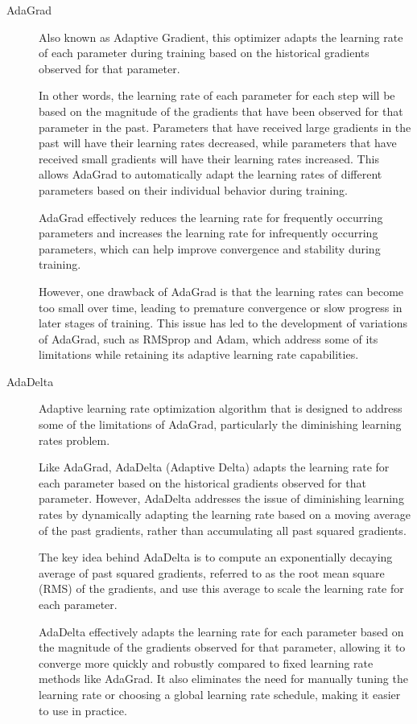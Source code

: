 \documentclass[a4paper]{article}
\begin{document}
\begin{description}
\item[AdaGrad]
Also known as Adaptive Gradient, this optimizer adapts the learning rate of each parameter during training based on the historical gradients observed for that parameter.

In other words, the learning rate of each parameter for each step will be based on the magnitude of the gradients that have been observed for that parameter in the past. Parameters that have received large gradients in the past will have their learning rates decreased, while parameters that have received small gradients will have their learning rates increased. This allows AdaGrad to automatically adapt the learning rates of different parameters based on their individual behavior during training.

AdaGrad effectively reduces the learning rate for frequently occurring parameters and increases the learning rate for infrequently occurring parameters, which can help improve convergence and stability during training. 

However, one drawback of AdaGrad is that the learning rates can become too small over time, leading to premature convergence or slow progress in later stages of training. This issue has led to the development of variations of AdaGrad, such as RMSprop and Adam, which address some of its limitations while retaining its adaptive learning rate capabilities.

\item[AdaDelta]
Adaptive learning rate optimization algorithm that is designed to address some of the limitations of AdaGrad, particularly the diminishing learning rates problem.

Like AdaGrad, AdaDelta (Adaptive Delta) adapts the learning rate for each parameter based on the historical gradients observed for that parameter. However, AdaDelta addresses the issue of diminishing learning rates by dynamically adapting the learning rate based on a moving average of the past gradients, rather than accumulating all past squared gradients.

The key idea behind AdaDelta is to compute an exponentially decaying average of past squared gradients, referred to as the root mean square (RMS) of the gradients, and use this average to scale the learning rate for each parameter.

AdaDelta effectively adapts the learning rate for each parameter based on the magnitude of the gradients observed for that parameter, allowing it to converge more quickly and robustly compared to fixed learning rate methods like AdaGrad. It also eliminates the need for manually tuning the learning rate or choosing a global learning rate schedule, making it easier to use in practice.


\end{description}
\end{document}
